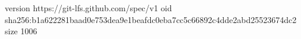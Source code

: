 version https://git-lfs.github.com/spec/v1
oid sha256:b1a622281baad0e753dea9e1beafdc0eba7cc5c66892c4dde2abd25523674dc2
size 1006
